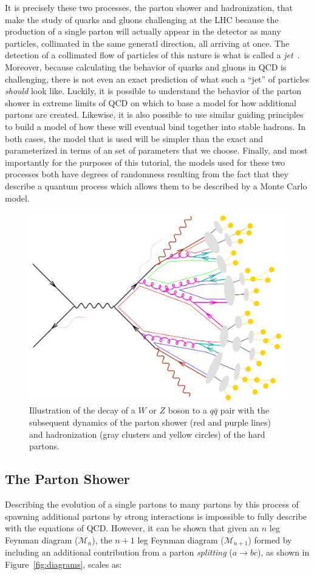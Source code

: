 \documentclass[UKenglish,texlive=2016]{\ATLASLATEXPATH atlasdoc}
\begin{document}
It is precisely these two processes, the parton shower and hadronization, that make the study of quarks and gluons challenging at the LHC because the production of a single parton will actually appear in the detector as many particles, collimated in the same generatl direction, all arriving at once.  The detection of a collimated flow of particles of this nature is what is called a \textit{jet}~\cite{Ellis:1276292,Ellis:2007ib}.  Moreover, because calculating the behavior of quarks and gluons in QCD is challenging, there is not even an exact prediction of what such a ``jet'' of particles \textit{should} look like.  Luckily, it is possible to understand the behavior of the parton shower in extreme limits of QCD on which to base a model for how additional partons are created.  Likewise, it is also possible to use similar guiding principles to build a model of how these will eventual bind together into stable hadrons.  In both cases, the model that is used will be simpler than the exact and parameterized in terms of an set of parameters that we choose.  Finally, and most importantly for the purposes of this tutorial, the models used for these two processes both have degrees of randomness resulting from the fact that they describe a quantum process which allows them to be described by a Monte Carlo model.  

\begin{figure}[!ht]
\centering
\includegraphics[width=0.6\columnwidth]{figures/ps.png}
\caption{Illustration of the decay of a $W$ or $Z$ boson to a $q\bar{q}$ pair with the subsequent dynamics of the parton shower (red and purple lines) and hadronization (gray clusters
and yellow circles) of the hard partons.  
\label{fig:shower}}
\end{figure}

\subsection{The Parton Shower}
\label{sec:ps}
Describing the evolution of a single partons to many partons by this process of spawning additional partons by strong interactions is impossible to fully describe with the equations of QCD.  However, it can be shown that given an $n$ leg Feynman diagram ($\mathcal{M}_{n}$), the $n+1$ leg Feynman diagram ($\mathcal{M}_{n+1}$) formed by including an additional contribution from a parton \textit{splitting} ($a\rightarrow bc$), as shown in Figure~\ref{fig:diagrams}, scales as:
\end{document}
